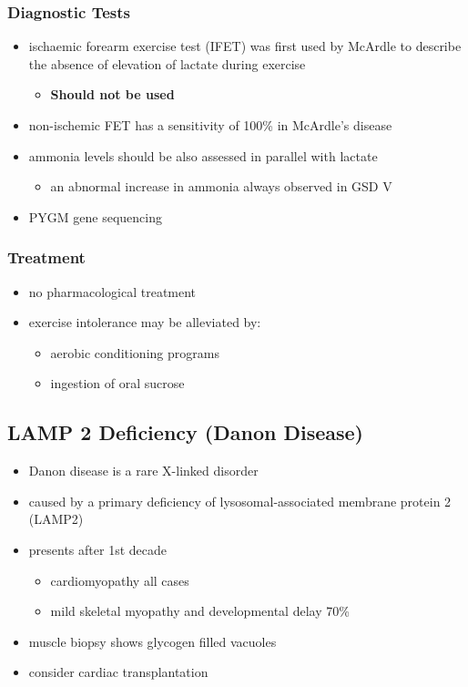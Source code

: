 \documentclass{scrartcl}
\begin{document}
\subsubsection{Diagnostic Tests}
\label{sec:org7a26e70}
\begin{itemize}
\item ischaemic forearm exercise test (IFET) was first used by McArdle to
describe the absence of elevation of lactate during exercise
\begin{itemize}
\item \textbf{Should not be used}
\end{itemize}
\item non-ischemic FET has a sensitivity of 100\% in McArdle’s disease
\item ammonia levels should be also assessed in parallel with lactate
\begin{itemize}
\item an abnormal increase in ammonia always observed in GSD V
\end{itemize}
\item PYGM gene sequencing
\end{itemize}

\subsubsection{Treatment}
\label{sec:orga04ceb5}
\begin{itemize}
\item no pharmacological treatment
\item exercise intolerance may be alleviated by:
\begin{itemize}
\item aerobic conditioning programs
\item ingestion of oral sucrose
\end{itemize}
\end{itemize}
\subsection{LAMP 2 Deficiency (Danon Disease)}
\label{sec:org391e905}
\begin{itemize}
\item Danon disease is a rare X-linked disorder
\item caused by a primary deficiency of lysosomal-associated membrane
protein 2 (LAMP2)
\item presents after 1st decade
\begin{itemize}
\item cardiomyopathy all cases
\item mild skeletal myopathy and developmental delay 70\%
\end{itemize}
\item muscle biopsy shows glycogen filled vacuoles
\item consider cardiac transplantation
\end{itemize}
\end{document}
